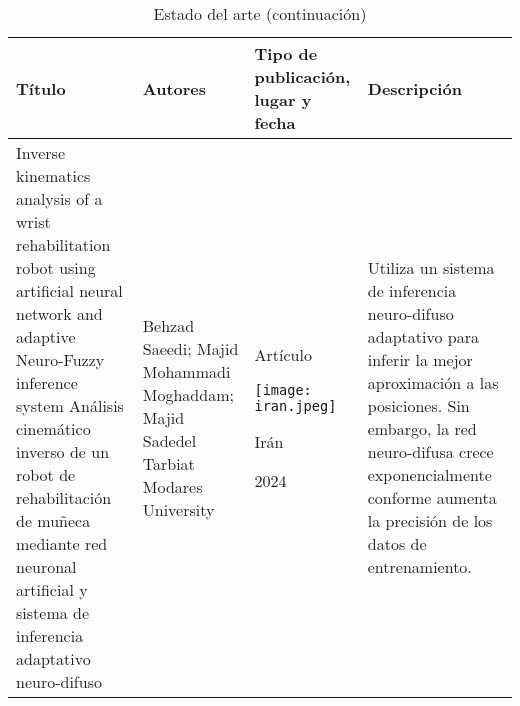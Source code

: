 \newpage
\begin{table}[htb]
	\caption{Estado del arte (continuación)}
	\centering
	\begin{tabular}{p{5cm}p{4cm}p{3.6cm}p{4cm}}
		\textbf{Título} & \textbf{Autores} & \textbf{Tipo de publicación, lugar y fecha} & \textbf{Descripción} \\ 
		\midrule
		Inverse kinematics analysis of a wrist rehabilitation robot using artificial neural network and adaptive Neuro-Fuzzy inference system \cite{estado3} \newline\newline
		Análisis cinemático inverso de un robot de rehabilitación de muñeca mediante red neuronal artificial y sistema de inferencia adaptativo neuro-difuso &  
		Behzad Saeedi; Majid Mohammadi Moghaddam; Majid Sadedel \newline\newline 
		Tarbiat Modares University & 
		\begin{center}Artículo \par \texttt{[image: iran.jpeg]} \par Irán \par 2024\end{center} & 
		Utiliza un sistema de inferencia neuro-difuso adaptativo para inferir la mejor aproximación a las posiciones. \newline\newline Sin embargo, la red neuro-difusa crece exponencialmente conforme aumenta la precisión de los datos de entrenamiento. \\
	\end{tabular}
\end{table}
